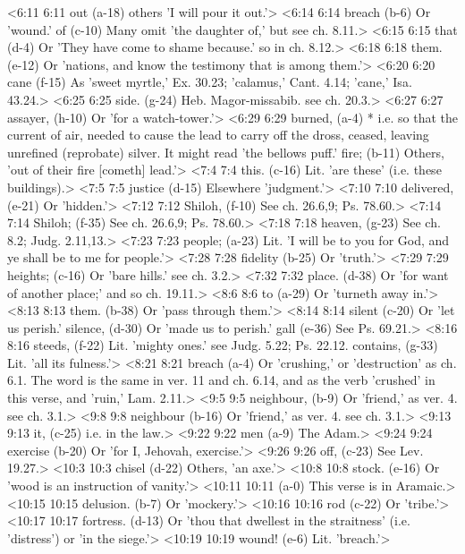 <6:11 6:11  out (a-18)  others 'I will pour it out.'>
<6:14 6:14  breach (b-6)  Or 'wound.'
  of (c-10)  Many omit 'the daughter of,' but see ch. 8.11.>
<6:15 6:15  that (d-4)  Or 'They have come to shame because.' so in ch. 8.12.>
<6:18 6:18  them. (e-12)  Or 'nations, and know the testimony that is among them.'>
<6:20 6:20  cane (f-15)  As 'sweet myrtle,' Ex. 30.23; 'calamus,' Cant. 4.14; 'cane,'  Isa. 43.24.>
<6:25 6:25  side. (g-24)  Heb. Magor-missabib. see ch. 20.3.>
<6:27 6:27  assayer, (h-10)  Or 'for a watch-tower.'>
<6:29 6:29  burned, (a-4)  * i.e. so that the current of air, needed to cause the lead  to carry off the dross, ceased, leaving unrefined (reprobate)  silver. It might read 'the bellows puff.'
  fire; (b-11)  Others, 'out of their fire [cometh] lead.'>
<7:4 7:4  this. (c-16)  Lit. 'are these' (i.e. these buildings).>
<7:5 7:5  justice (d-15)  Elsewhere 'judgment.'>
<7:10 7:10  delivered, (e-21)  Or 'hidden.'>
<7:12 7:12  Shiloh, (f-10)  See ch. 26.6,9; Ps. 78.60.>
<7:14 7:14  Shiloh; (f-35)  See ch. 26.6,9; Ps. 78.60.>
<7:18 7:18  heaven, (g-23)  See ch. 8.2; Judg. 2.11,13.>
<7:23 7:23  people; (a-23)  Lit. 'I will be to you for God, and ye shall be to me for  people.'>
<7:28 7:28  fidelity (b-25)  Or 'truth.'>
<7:29 7:29  heights; (c-16)  Or 'bare hills.' see ch. 3.2.>
<7:32 7:32  place. (d-38)  Or 'for want of another place;' and so ch. 19.11.>
<8:6 8:6  to (a-29)  Or 'turneth away in.'>
<8:13 8:13  them. (b-38)  Or 'pass through them.'>
<8:14 8:14  silent (c-20)  Or 'let us perish.'
  silence, (d-30)  Or 'made us to perish.'
  gall (e-36)  See Ps. 69.21.>
<8:16 8:16  steeds, (f-22)  Lit. 'mighty ones.' see Judg. 5.22; Ps. 22.12.
  contains, (g-33)  Lit. 'all its fulness.'>
<8:21 8:21  breach (a-4)  Or 'crushing,' or 'destruction' as ch. 6.1. The word is the  same in ver. 11 and ch. 6.14, and as the verb 'crushed' in this  verse, and 'ruin,' Lam. 2.11.>
<9:5 9:5  neighbour, (b-9) Or 'friend,' as ver. 4. see ch. 3.1.>
<9:8 9:8  neighbour (b-16)  Or 'friend,' as ver. 4. see ch. 3.1.>
<9:13 9:13  it, (c-25)  i.e. in the law.>
<9:22 9:22  men (a-9)  The Adam.>
<9:24 9:24  exercise (b-20)  Or 'for I, Jehovah, exercise.'>
<9:26 9:26  off, (c-23)  See Lev. 19.27.>
<10:3 10:3  chisel (d-22)  Others, 'an axe.'>
<10:8 10:8  stock. (e-16)  Or 'wood is an instruction of vanity.'>
<10:11 10:11   (a-0)  This verse is in Aramaic.>
<10:15 10:15  delusion. (b-7)  Or 'mockery.'>
<10:16 10:16  rod (c-22)  Or 'tribe.'>
<10:17 10:17  fortress. (d-13)  Or 'thou that dwellest in the straitness' (i.e. 'distress')  or 'in the siege.'>
<10:19 10:19  wound! (e-6)  Lit. 'breach.'>
